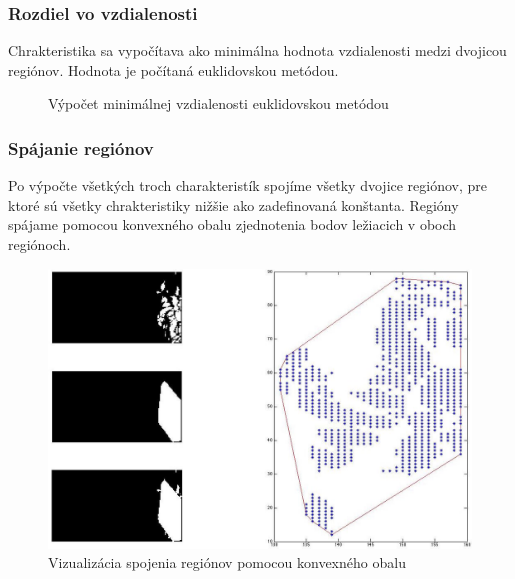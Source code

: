 \subsubsection{Rozdiel vo vzdialenosti}
Chrakteristika sa vypočítava ako minimálna hodnota vzdialenosti medzi dvojicou regiónov.
Hodnota je počítaná euklidovskou metódou.

\begin{figure}[H]
  \begin{algorithm}[H]
   \caption{Výpočet minimálnej vzdialenosti euklidovskou metódou}
  \end{algorithm}
  \vspace{10mm}
\end{figure}

\subsubsection{Spájanie regiónov}
Po výpočte všetkých troch charakteristík spojíme všetky dvojice regiónov, pre ktoré sú všetky chrakteristiky nižšie ako zadefinovaná konštanta.
Regióny spájame pomocou konvexného obalu zjednotenia bodov ležiacich v oboch regiónoch.
\begin{figure}[H]
  \centering
  \includegraphics[width=15cm]{pics/spojenie-regionov.jpg}
  \caption{Vizualizácia spojenia regiónov pomocou konvexného obalu}
  \vspace{10mm}
\end{figure}

